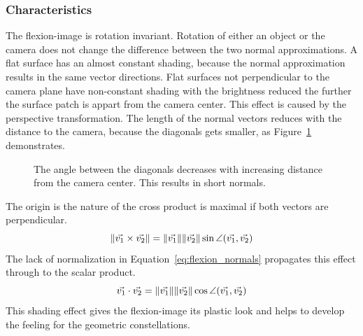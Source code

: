 \subsubsection*{Characteristics}

The \gls{flexion-image} is rotation invariant.
Rotation of either an object or the camera does not change the difference between the two normal approximations.
A flat surface has an almost constant shading, because the normal approximation results in the same vector directions.
Flat surfaces not perpendicular to the camera plane have non-constant shading with the brightness reduced the further the surface patch is appart from the camera center.
This effect is caused by the perspective transformation.
The length of the normal vectors reduces with the distance to the camera, because the diagonals gets smaller, as Figure~\ref{fig:flexion_angle_decrease} demonstrates.
\begin{figure}[H]
    
    \caption{The angle between the diagonals decreases with increasing distance from the camera center. This results in short normals.}\label{fig:flexion_angle_decrease}
\end{figure}
The origin is the nature of the cross product is maximal if both vectors are perpendicular.
\begin{equation*}
    \lVert\vec{v_1} \times \vec{v_2}\rVert = \lVert\vec{v_1}\rVert \lVert\vec{v_2}\rVert \sin \angle(\vec{v_1}, \vec{v_2})
\end{equation*}
The lack of normalization in Equation~\ref{eq:flexion_normals} propagates this effect through to the scalar product.
\begin{equation*}
    \vec{v_1} \cdot \vec{v_2} = \lVert\vec{v_1}\rVert \lVert\vec{v_2}\rVert \cos \angle(\vec{v_1}, \vec{v_2})
\end{equation*}
This shading effect gives the \gls{flexion-image} its plastic look and helps to develop the feeling for the geometric constellations.
